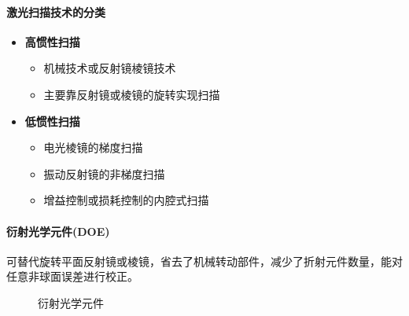 \paragraph{激光扫描技术的分类}
\begin{itemize}
	\item \textbf{高惯性扫描}
		\begin{itemize}
			\item 机械技术或反射镜棱镜技术
			\item 主要靠反射镜或棱镜的旋转实现扫描
		\end{itemize} %
	\item \textbf{低惯性扫描}
		\begin{itemize}
			\item 电光棱镜的梯度扫描
			\item 振动反射镜的非梯度扫描
			\item 增益控制或损耗控制的内腔式扫描
		\end{itemize}
\end{itemize} %

\paragraph{衍射光学元件(DOE)}可替代旋转平面反射镜或棱镜，省去了机械转动部件，减少了折射元件数量，能对任意非球面误差进行校正。
\begin{figure}
	\centering
	\quad
	\caption{衍射光学元件}
	\label{fig:衍射光学元件}
\end{figure}

